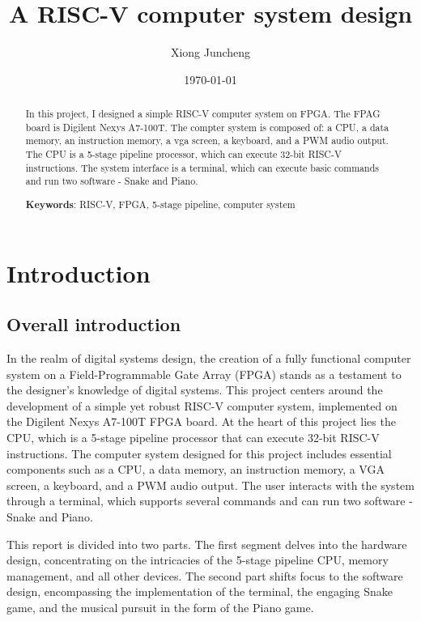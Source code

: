 \documentclass[12pt, a4paper, oneside]{article}
\title{\textbf{A RISC-V computer system design}}
\author{Xiong Juncheng}
\date{\today}
\begin{document}
\maketitle

\setcounter{page}{0}
\maketitle
\thispagestyle{empty}

\begin{abstract}
    In this project, I designed a simple RISC-V computer system on FPGA. The FPAG board is Digilent Nexys A7-100T. The compter system is composed of: a CPU, a data memory, an instruction memory, a vga screen, a keyboard, and a PWM audio output. The CPU is a 5-stage pipeline processor, which can execute 32-bit RISC-V instructions. The system interface is a terminal, which can execute basic commands and run two software - Snake and Piano.

    \textbf{Keywords}: RISC-V, FPGA, 5-stage pipeline, computer system
\end{abstract}
\newpage

\tableofcontents
\newpage

\setcounter{page}{1}
\section{Introduction}
\subsection{Overall introduction}

In the realm of digital systems design, the creation of a fully functional computer system on a Field-Programmable Gate Array (FPGA) stands as a testament to the designer's knowledge of digital systems. This project centers around the development of a simple yet robust RISC-V computer system, implemented on the Digilent Nexys A7-100T FPGA board. At the heart of this project lies the CPU, which is a 5-stage pipeline processor that can execute 32-bit RISC-V instructions. The computer system designed for this project includes essential components such as a CPU, a data memory, an instruction memory, a VGA screen, a keyboard, and a PWM audio output. The user interacts with the system through a terminal, which supports several commands and can run two software - Snake and Piano.

This report is divided into two parts. The first segment delves into the hardware design, concentrating on the intricacies of the 5-stage pipeline CPU, memory management, and all other devices. The second part shifts focus to the software design, encompassing the implementation of the terminal, the engaging Snake game, and the musical pursuit in the form of the Piano game.
\end{document}
